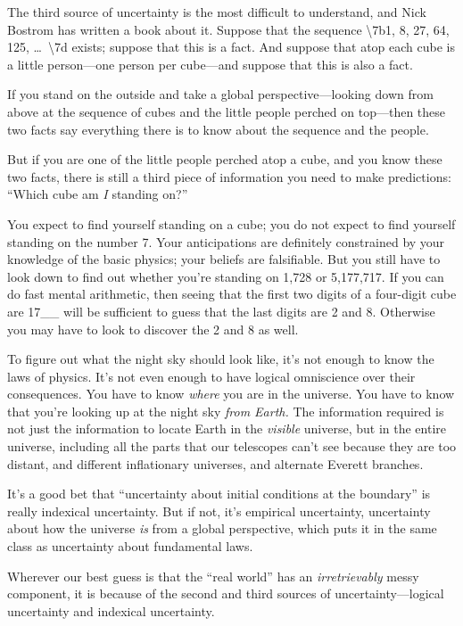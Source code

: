{
 The third source of uncertainty is the most difficult to
understand, and Nick Bostrom has written a book about it. Suppose that
the sequence {\textbackslash}{\textquotesingle}7b1, 8, 27, 64, 125,
\ldots~{\textbackslash}{\textquotesingle}7d exists; suppose that this is
a fact. And suppose that atop each cube is a little person---one person
per cube---and suppose that this is also a fact.}

{
 If you stand on the outside and take a global
perspective---looking down from above at the sequence of cubes and the
little people perched on top---then these two facts say everything
there is to know about the sequence and the people.}

{
 But if you are one of the little people perched atop a cube, and
you know these two facts, there is still a third piece of information
you need to make predictions: ``Which cube am
\textit{I} standing on?''}

{
 You expect to find yourself standing on a cube; you do not expect
to find yourself standing on the number 7. Your anticipations are
definitely constrained by your knowledge of the basic physics; your
beliefs are falsifiable. But you still have to look down to find out
whether you're standing on 1,728 or 5,177,717. If you
can do fast mental arithmetic, then seeing that the first two digits of
a four-digit cube are 17\_\_ will be sufficient to guess that the last
digits are 2 and 8. Otherwise you may have to look to discover the 2
and 8 as well.}

{
 To figure out what the night sky should look like,
it's not enough to know the laws of physics.
It's not even enough to have logical omniscience over
their consequences. You have to know \textit{where} you are in the
universe. You have to know that you're looking up at
the night sky \textit{from Earth.} The information required is not just
the information to locate Earth in the \textit{visible} universe, but
in the entire universe, including all the parts that our telescopes
can't see because they are too distant, and different
inflationary universes, and alternate Everett branches.}

{
 It's a good bet that
``uncertainty about initial conditions at the
boundary'' is really indexical uncertainty. But if
not, it's empirical uncertainty, uncertainty about how
the universe \textit{is} from a global perspective, which puts it in
the same class as uncertainty about fundamental laws.}

{
 Wherever our best guess is that the ``real
world'' has an \textit{irretrievably} messy
component, it is because of the second and third sources of
uncertainty---logical uncertainty and indexical uncertainty.}

